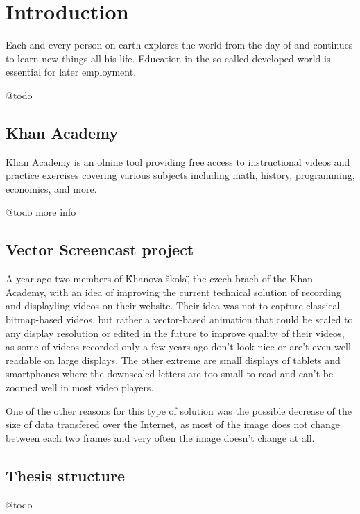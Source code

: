 \chapter*{Introduction}
Each and every person on earth explores the world from the day of and continues to learn new things all his life. Education in the so-called developed world is essential for later employment.

@todo 

\section*{Khan Academy}
Khan Academy is an olnine tool providing free access to instructional videos and practice exercises covering various subjects including math, history, programming, economics, and more.

@todo more info

\section*{Vector Screencast project}
A year ago two members of \"Khanova škola\", the czech brach of the Khan Academy, with an idea of improving the current technical solution of recording and displayling videos on their website. Their idea was not to capture classical bitmap-based videos, but rather a vector-based animation that could be scaled to any display resolution or edited in the future to improve quality of their videos, as some of videos recorded only a few years ago don't look nice or are't even well readable on large displays. The other extreme are small displays of tablets and smartphones where the downscaled letters are too small to read and can't be zoomed well in most video players.

One of the other reasons for this type of solution was the possible decrease of the size of data transfered over the Internet, as most of the image does not change between each two frames and very often the image doesn't change at all.

\section*{Thesis structure}
@todo